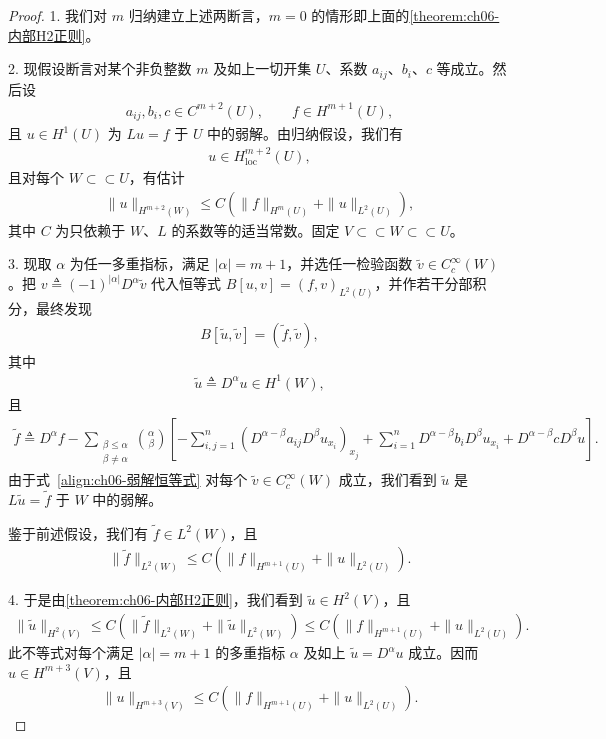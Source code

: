 \documentclass[../../main.tex]{subfiles}
\begin{document}
\begin{proof}
1. 我们对 $m$ 归纳建立上述两断言，$m=0$ 的情形即上面的\cref{theorem:ch06-内部H2正则}。

2. 现假设断言对某个非负整数 $m$ 及如上一切开集 $U$、系数 $a_{ij}$、$b_{i}$、$c$ 等成立。然后设
\begin{align}
a_{ij},b_{i},c\in C^{m+2}(U),\qquad f\in H^{m+1}(U),
\end{align}
且 $u\in H^{1}(U)$ 为 $Lu=f$ 于 $U$ 中的弱解。由归纳假设，我们有
\begin{align}
u\in H^{m+2}_{\mathrm{loc}}(U),
\end{align}
且对每个 $W\subset \subset U$，有估计
\begin{align}
\|u\|_{H^{m+2}(W)}\leqslant C(\|f\|_{H^{m}(U)}+\|u\|_{L^{2}(U)}),
\end{align}
其中 $C$ 为只依赖于 $W$、$L$ 的系数等的适当常数。固定 $V\subset \subset W\subset \subset U$。

3. 现取 $\alpha$ 为任一多重指标，满足 $|\alpha|=m+1$，并选任一检验函数 $\widetilde{v}\in C^{\infty}_{c}(W)$。把 $v\triangleq(-1)^{|\alpha|}D^{\alpha}\widetilde{v}$ 代入恒等式 $B[u,v]=(f,v)_{L^{2}(U)}$，并作若干分部积分，最终发现
\begin{align}
B[\widetilde{u},\widetilde{v}]=(\widetilde{f},\widetilde{v}),
\end{align}
其中
\begin{align}
\widetilde{u}\triangleq D^{\alpha}u\in H^{1}(W),
\end{align}
且
\begin{align}
\widetilde{f}\triangleq D^{\alpha}f-\sum_{\substack{\beta\leqslant\alpha\\ \beta\neq\alpha}}\binom{\alpha}{\beta}\left[-\sum_{i,j=1}^{n}(D^{\alpha-\beta}a_{ij}D^{\beta}u_{x_{i}})_{x_{j}}+\sum_{i=1}^{n}D^{\alpha-\beta}b_{i}D^{\beta}u_{x_{i}}+D^{\alpha-\beta}cD^{\beta}u\right].
\end{align}
由于式~\eqref{align:ch06-弱解恒等式} 对每个 $\widetilde{v}\in C^{\infty}_{c}(W)$ 成立，我们看到 $\widetilde{u}$ 是 $L\widetilde{u}=\widetilde{f}$ 于 $W$ 中的弱解。

鉴于前述假设，我们有 $\widetilde{f}\in L^{2}(W)$，且
\begin{align}
\|\widetilde{f}\|_{L^{2}(W)}\leqslant C(\|f\|_{H^{m+1}(U)}+\|u\|_{L^{2}(U)}).
\end{align}

4. 于是由\cref{theorem:ch06-内部H2正则}，我们看到 $\widetilde{u}\in H^{2}(V)$，且
\begin{align*}
\|\widetilde{u}\|_{H^{2}(V)}
\leqslant C(\|\widetilde{f}\|_{L^{2}(W)}+\|\widetilde{u}\|_{L^{2}(W)})
\leqslant C(\|f\|_{H^{m+1}(U)}+\|u\|_{L^{2}(U)}).
\end{align*}
此不等式对每个满足 $|\alpha|=m+1$ 的多重指标 $\alpha$ 及如上 $\widetilde{u}=D^{\alpha}u$ 成立。因而 $u\in H^{m+3}(V)$，且
\begin{align*}
\|u\|_{H^{m+3}(V)}\leqslant C(\|f\|_{H^{m+1}(U)}+\|u\|_{L^{2}(U)}).
\end{align*}
\end{proof}
\end{document}
